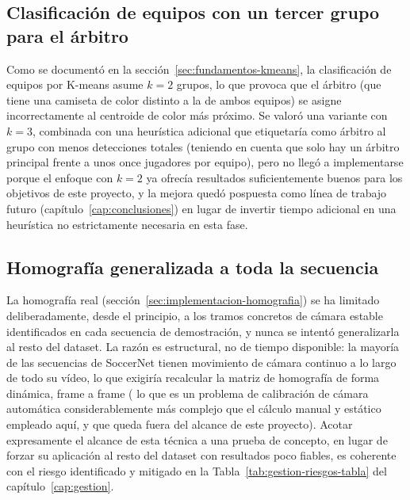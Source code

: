 \subsection{Clasificación de equipos con un tercer grupo para el árbitro}

Como se documentó en la sección~\ref{sec:fundamentos-kmeans}, la
clasificación de equipos por K-means asume $k=2$ grupos, lo que
provoca que el árbitro (que tiene una camiseta de color distinto a la de ambos
equipos) se asigne incorrectamente al centroide de color más próximo. Se
valoró una variante con $k=3$, combinada con una heurística adicional que
etiquetaría como árbitro al grupo con menos detecciones totales (teniendo en cuenta
que
solo hay un árbitro principal frente a unos once jugadores por equipo),
pero no llegó a implementarse porque el enfoque con $k=2$ ya ofrecía resultados
suficientemente buenos para los objetivos de este proyecto, y la mejora
quedó pospuesta como línea de trabajo futuro
(capítulo~\ref{cap:conclusiones}) en lugar de invertir tiempo adicional en
una heurística no estrictamente necesaria en esta fase.

\subsection{Homografía generalizada a toda la secuencia}

La homografía real (sección~\ref{sec:implementacion-homografia}) se ha
limitado deliberadamente, desde el principio, a los tramos concretos de
cámara estable identificados en cada secuencia de demostración, y nunca se
intentó generalizarla al resto del dataset. La razón es estructural, no de
tiempo disponible: la mayoría de las secuencias de SoccerNet tienen
movimiento de cámara continuo a lo largo de todo su vídeo,
lo que exigiría recalcular la matriz de homografía de forma dinámica,
frame a frame ( lo que es un problema de calibración de cámara automática
considerablemente más complejo que el cálculo manual y estático empleado
aquí, y que queda fuera del alcance de este proyecto). Acotar expresamente el
alcance de esta técnica a una prueba de concepto, en lugar de forzar su
aplicación al resto del dataset con resultados poco fiables, es coherente
con el riesgo identificado y mitigado en la
Tabla~\ref{tab:gestion-riesgos-tabla} del capítulo~\ref{cap:gestion}.
